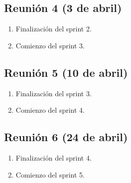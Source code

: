 \subsection{Reunión 4 (3 de abril)}
\begin{enumerate}
	\item Finalización del sprint 2.
	\item Comienzo del sprint 3.
\end{enumerate}

\subsection{Reunión 5 (10 de abril)}
\begin{enumerate}
	\item Finalización del sprint 3.
	\item Comienzo del sprint 4.
\end{enumerate}

\subsection{Reunión 6 (24 de abril)}
\begin{enumerate}
	\item Finalización del sprint 4.
	\item Comienzo del sprint 5.
\end{enumerate}
